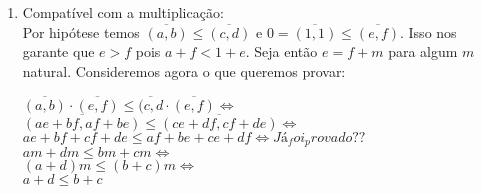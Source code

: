 \documentclass[../main.tex]{subfiles}
\begin{document}
\begin{dem}
\begin{enumerate}[label=(\roman*)]
        \item Compatível com a multiplicação: \\
        Por hipótese temos $\overline{(a,b)} \leq \overline{(c,d)}$ e $0 = \overline{(1,1)} \leq \overline{(e,f)}$.
        Isso nos garante que $e > f$ pois $a+f < 1+e$. Seja então $e = f+m$ para algum $m$ natural. Consideremos agora o que queremos provar:
        \begin{center}
            $\overline{(a,b)} \cdot \overline{(e,f)} \leq \overline{(c,d} \cdot \overline{(e,f)} \iff $ \\
            $\overline{(ae+bf, af+be)} \leq \overline{(ce+df, cf+de)} \iff $ \\
            $ae+bf + cf+de \leq af+be + ce+df \iff Já_foi_provado??$ \\
            $am + dm \leq bm + cm \iff$ \\
            $(a+d)m \leq (b+c)m \iff$ \\
            $a+d \leq b+c$
        \end{center}        
        
    \end{enumerate}
\end{dem}
\end{document}
